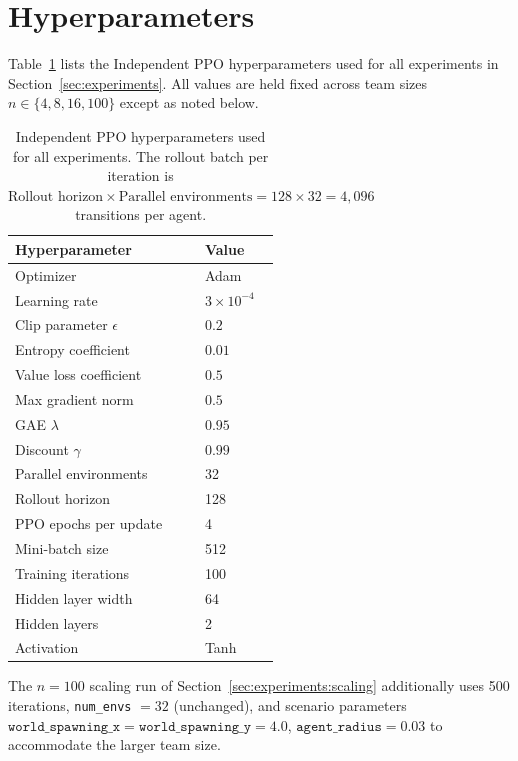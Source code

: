 \documentclass{article}
\theoremstyle{plain}
\theoremstyle{definition}
\theoremstyle{remark}
\begin{document}
\section{Hyperparameters}
\label{app:hyperparams}

Table~\ref{tab:hyperparams} lists the Independent PPO hyperparameters
used for all experiments in Section~\ref{sec:experiments}. All values
are held fixed across team sizes $n \in \{4, 8, 16, 100\}$ except as
noted below.

\begin{table}[ht]
\centering
\begin{tabular}{ll}
\toprule
\textbf{Hyperparameter} & \textbf{Value} \\
\midrule
Optimizer & Adam \\
Learning rate & $3 \times 10^{-4}$ \\
Clip parameter $\epsilon$ & $0.2$ \\
Entropy coefficient & $0.01$ \\
Value loss coefficient & $0.5$ \\
Max gradient norm & $0.5$ \\
GAE $\lambda$ & $0.95$ \\
Discount $\gamma$ & $0.99$ \\
Parallel environments & 32 \\
Rollout horizon & 128 \\
PPO epochs per update & 4 \\
Mini-batch size & 512 \\
Training iterations & 100 \\
Hidden layer width & 64 \\
Hidden layers & 2 \\
Activation & Tanh \\
\bottomrule
\end{tabular}
\caption{Independent PPO hyperparameters used for all experiments.
The rollout batch per iteration is $\text{Rollout horizon} \times
\text{Parallel environments} = 128 \times 32 = 4{,}096$ transitions
per agent.}
\label{tab:hyperparams}
\end{table}
The $n = 100$ scaling run of Section~\ref{sec:experiments:scaling} additionally uses 500 iterations, \texttt{num\_envs} $= 32$ (unchanged), and scenario parameters $\texttt{world\_spawning\_x} = \texttt{world\_spawning\_y} = 4.0$, $\texttt{agent\_radius} = 0.03$ to accommodate the larger team size.

\end{document}
